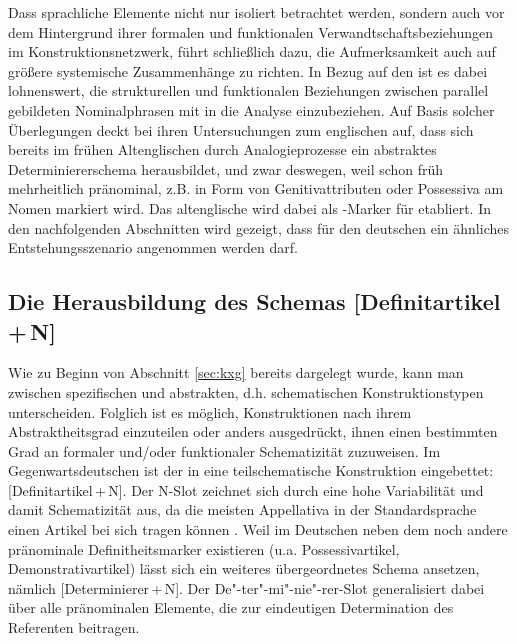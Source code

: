 Dass sprachliche Elemente nicht nur isoliert betrachtet werden, sondern auch vor dem Hintergrund ihrer formalen und funktionalen Verwandtschaftsbeziehungen im Konstruktionsnetzwerk, führt schließlich dazu, die Aufmerksamkeit auch auf größere systemische Zusammenhänge zu richten. In Bezug auf den  ist es dabei lohnenswert, die strukturellen und funktionalen Beziehungen zwischen parallel gebildeten Nominalphrasen mit in die Analyse einzubeziehen. Auf Basis solcher Überlegungen deckt \textcite{Sommerer2011,Sommerer2012,Sommerer2015} bei ihren Untersuchungen zum englischen  auf, dass sich bereits im frühen Altenglischen durch Analogieprozesse  ein abstraktes Determiniererschema herausbildet, und zwar deswegen, weil  schon früh mehrheitlich pränominal, z.B. in Form von Genitivattributen oder Possessiva  am Nomen markiert wird. Das altenglische   wird dabei als -Marker für  etabliert. In den nachfolgenden Abschnitten wird gezeigt, dass für den deutschen  ein ähnliches Entstehungsszenario angenommen werden darf.

\subsection{Die Herausbildung des Schemas [Definitartikel\,+\,N]}\label{sec:schema}

Wie zu Beginn von Abschnitt \ref{sec:kxg} bereits dargelegt wurde, kann man zwischen spezifischen  und abstrakten, d.h. schematischen Konstruktionstypen unterscheiden.
Folglich ist es möglich, Konstruktionen nach ihrem Abstraktheitsgrad einzuteilen oder anders ausgedrückt, ihnen einen bestimmten Grad an formaler und/\-oder funktionaler Schematizität zuzuweisen. Im Gegenwartsdeutschen ist der  in eine teilschematische Konstruktion   eingebettet: [Definitartikel\,+\,N]. Der N-Slot zeichnet sich durch eine hohe Variabilität und damit Schematizität aus, da die meisten Appellativa in der Standardsprache einen Artikel bei sich tragen können \parencite[zu den Ausnahmen s.][]{DAvis2013}.
Weil im Deutschen neben dem  noch andere pränominale Definitheitsmarker  existieren (u.a. Possessivartikel, Demonstrativartikel)   lässt sich ein weiteres übergeordnetes Schema ansetzen, nämlich [Determinierer\,+\,N]. Der De"-ter"-mi"-nie"-rer-Slot generalisiert dabei über alle pränominalen Elemente, die zur eindeutigen Determination des Referenten beitragen. 

